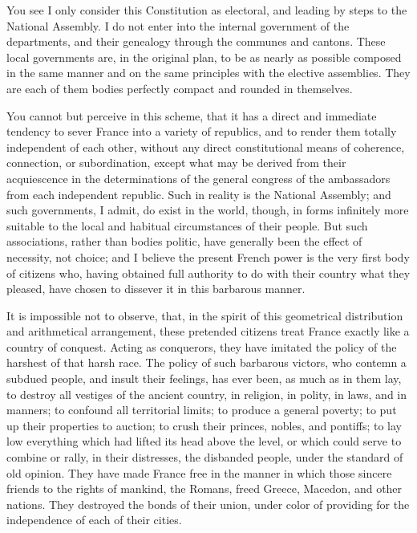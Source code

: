 You see I only consider this Constitution as electoral, and leading by steps to the National Assembly. I do not enter into the internal government of the departments, and their genealogy through the communes and cantons. These local governments are, in the original plan, to be as nearly as possible composed in the same manner and on the same principles with the elective assemblies. They are each of them bodies perfectly compact and rounded in themselves.

You cannot but perceive in this scheme, that it has a direct and immediate tendency to sever France into a variety of republics, and to render them totally independent of each other, without any direct constitutional means of coherence, connection, or subordination, except what may be derived from their acquiescence in the determinations of the general congress of the ambassadors from each independent republic. Such in reality is the National Assembly; and such governments, I admit, do exist in the world, though, in forms infinitely more suitable to the local and habitual circumstances of their people. But such associations, rather than bodies politic, have generally been the effect of necessity, not choice; and I believe the present French power is the very first body of citizens who, having obtained full authority to do with their country what they pleased, have chosen to dissever it in this barbarous manner.

It is impossible not to observe, that, in the spirit of this geometrical distribution and arithmetical arrangement, these pretended citizens treat France exactly like a country of conquest. Acting as conquerors, they have imitated the policy of the harshest of that harsh race. The policy of such barbarous victors, who contemn a subdued people, and insult their feelings, has ever been, as much as in them lay, to destroy all vestiges of the ancient country, in religion, in polity, in laws, and in manners; to confound all territorial limits; to produce a general poverty; to put up their properties to auction; to crush their princes, nobles, and pontiffs; to lay low everything which had lifted its head above the level, or which could serve to combine or rally, in their distresses, the disbanded people, under the standard of old opinion. They have made France free in the manner in which those sincere friends to the rights of mankind, the Romans, freed Greece, Macedon, and other nations. They destroyed the bonds of their union, under color of providing for the independence of each of their cities.

